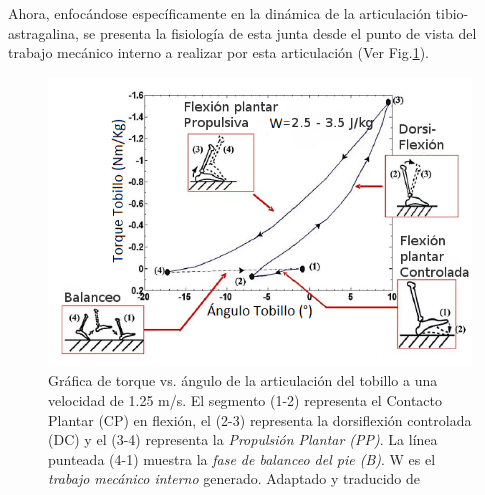 \documentclass[12pt,english]{article}
\begin{document}
\begin{description}
Ahora, enfocándose específicamente en la dinámica de la articulación
tibio-astragalina, se presenta la fisiología de esta junta desde el
punto de vista del trabajo mecánico interno a realizar por esta articulación
(Ver Fig.\ref{fig:Gr=0000E1fica-de-torque}).


\begin{figure}[H]
\begin{centering}
\includegraphics[scale=0.7]{cinneticatobillo}
\par\end{centering}

\caption{\label{fig:Gr=0000E1fica-de-torque}Gráfica de torque vs. ángulo de
la articulación del tobillo a una velocidad de 1.25 m/s. El segmento
(1-2) representa el Contacto Plantar (CP)
en flexión, el (2-3) representa la dorsiflexión controlada (DC)
y el (3-4) representa la \emph{Propulsión Plantar (PP)}.
La línea punteada (4-1) muestra la \emph{fase de balanceo del pie
(B)}. W
es el \emph{trabajo mecánico interno} generado. Adaptado y traducido
de \cite{Au2009}}
\end{figure}



\end{description}
\end{document}
